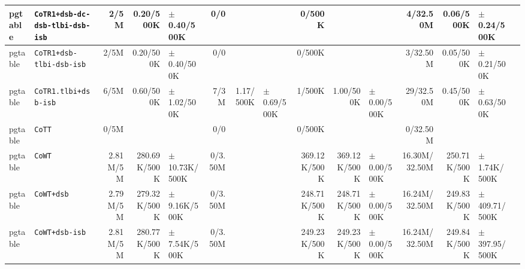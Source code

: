 \begin{tabular}{l l  | r r l | r r l | r r l | r r l l}
         pgtable &                       \verb|CoTR1+dsb-dc-dsb-tlbi-dsb-isb| &           2/5M &             0.20/500K &   $\pm$ 0.40/500K &            0/0 &                       &                 &         0/500K &                       &                   &       4/32.50M &             0.06/500K &   $\pm$ 0.24/500K & \\ \hline 
         pgtable &                              \verb|CoTR1+dsb-tlbi-dsb-isb| &           2/5M &             0.20/500K &   $\pm$ 0.40/500K &            0/0 &                       &                 &         0/500K &                       &                   &       3/32.50M &             0.05/500K &   $\pm$ 0.21/500K & \\ \hline 
         pgtable &                                  \verb|CoTR1.tlbi+dsb-isb| &           6/5M &             0.60/500K &   $\pm$ 1.02/500K &           7/3M &             1.17/500K & $\pm$ 0.69/500K &         1/500K &             1.00/500K &   $\pm$ 0.00/500K &      29/32.50M &             0.45/500K &   $\pm$ 0.63/500K & \\ \hline 
         pgtable &                                                \verb|CoTT| &           0/5M &                       &                   &            0/0 &                       &                 &         0/500K &                       &                   &       0/32.50M &                       &                   & \\ \hline 
         pgtable &                                                \verb|CoWT| &       2.81M/5M &          280.69K/500K & $\pm$ 10.73K/500K &        0/3.50M &                       &                 &   369.12K/500K &          369.12K/500K &   $\pm$ 0.00/500K &  16.30M/32.50M &          250.71K/500K &  $\pm$ 1.74K/500K & \\ \hline 
         pgtable &                                            \verb|CoWT+dsb| &       2.79M/5M &          279.32K/500K &  $\pm$ 9.16K/500K &        0/3.50M &                       &                 &   248.71K/500K &          248.71K/500K &   $\pm$ 0.00/500K &  16.24M/32.50M &          249.83K/500K & $\pm$ 409.71/500K & \\ \hline 
         pgtable &                                        \verb|CoWT+dsb-isb| &       2.81M/5M &          280.77K/500K &  $\pm$ 7.54K/500K &        0/3.50M &                       &                 &   249.23K/500K &          249.23K/500K &   $\pm$ 0.00/500K &  16.24M/32.50M &          249.84K/500K & $\pm$ 397.95/500K & \\ \hline 

\end{tabular}
